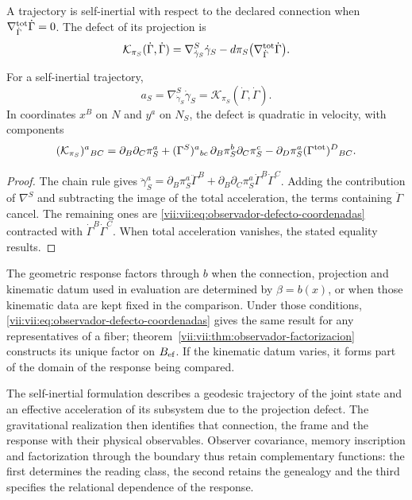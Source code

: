 \begin{definition}
\label{vii:vii:def:observador-autoinercia}
A trajectory is self-inertial with respect to the declared connection
when \(\nabla^{\rm tot}_{\dot\Gamma}\dot\Gamma=0\).
The defect of its projection is
\begin{equation}
 \mathcal K_{\pi_S}(\dot\Gamma,\dot\Gamma)
 =\nabla^S_{\dot\gamma_S}\dot\gamma_S
  -d\pi_S\bigl(\nabla^{\rm tot}_{\dot\Gamma}\dot\Gamma\bigr).
 \label{vii:vii:eq:observador-defecto-proyeccion}
\end{equation}
\end{definition}

\begin{proposition}
\label{vii:vii:prop:observador-aceleracion}
For a self-inertial trajectory,
\[
 a_S=\nabla^S_{\dot\gamma_S}\dot\gamma_S
     =\mathcal K_{\pi_S}(\dot\Gamma,\dot\Gamma).
\]
In coordinates \(x^B\) on \(N\) and \(y^a\) on \(N_S\), the
defect is quadratic in velocity, with components
\begin{equation}
 (\mathcal K_{\pi_S})^a{}_{BC}
 =\partial_B\partial_C\pi_S^a
  +(\Gamma^S)^a{}_{bc}\,
        \partial_B\pi_S^b\partial_C\pi_S^c
  -\partial_D\pi_S^a(\Gamma^{\rm tot})^D{}_{BC}.
 \label{vii:vii:eq:observador-defecto-coordenadas}
\end{equation}
\end{proposition}

\begin{proof}
The chain rule gives
\(\ddot\gamma_S^a=\partial_B\pi_S^a\ddot\Gamma^B
 +\partial_B\partial_C\pi_S^a\dot\Gamma^B\dot\Gamma^C\).
Adding the contribution of \(\nabla^S\) and subtracting the image of
the total acceleration, the terms containing \(\ddot\Gamma\)
cancel. The remaining ones are
\eqref{vii:vii:eq:observador-defecto-coordenadas} contracted with
\(\dot\Gamma^B\dot\Gamma^C\). When total acceleration vanishes,
the stated equality results.
\end{proof}

The geometric response factors through \(b\) when the connection,
projection and kinematic datum used in evaluation are
determined by \(\beta=b(x)\), or when those kinematic data are
kept fixed in the comparison. Under those conditions,
\eqref{vii:vii:eq:observador-defecto-coordenadas} gives the same result
for any representatives of a fiber;
theorem~\ref{vii:vii:thm:observador-factorizacion} constructs its unique
factor on \(B_{\rm ef}\). If the kinematic datum varies, it
forms part of the domain of the response being compared.

The self-inertial formulation describes a geodesic trajectory of the
joint state and an effective acceleration of its subsystem due
to the projection defect. The gravitational realization then identifies
that connection, the frame and the response with their physical
observables. Observer covariance, memory inscription and
factorization through the boundary thus retain complementary functions:
the first determines the reading class, the second retains the
genealogy and the third specifies the relational dependence of the
response.
